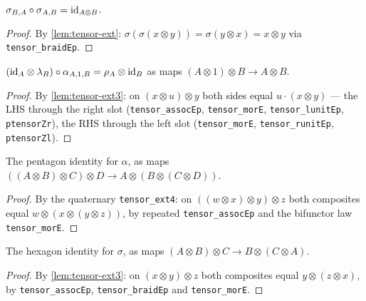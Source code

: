 \begin{lemma}\label{lem:braid-invol}
\rocqok
{}
$\sigma_{B,A} \circ \sigma_{A,B} = \mathrm{id}_{A \otimes B}$.
\end{lemma}
\begin{proof}
By \autoref{lem:tensor-ext}: $\sigma(\sigma(x \otimes y)) = \sigma(y
\otimes x) = x \otimes y$ via \texttt{tensor\_braidEp}.
\end{proof}

\begin{lemma}\label{lem:triangle}
\rocqok
{}
$(\mathrm{id}_A \otimes \lambda_B) \circ \alpha_{A,1,B} = \rho_A \otimes \mathrm{id}_B$
as maps $(A \otimes 1) \otimes B \to A \otimes B$.
\end{lemma}
\begin{proof}
By \autoref{lem:tensor-ext3}: on $(x \otimes u) \otimes y$ both sides
equal $u \cdot (x \otimes y)$ --- the LHS through the right slot
(\texttt{tensor\_assocEp}, \texttt{tensor\_morE},
\texttt{tensor\_lunitEp}, \texttt{ptensorZr}), the RHS through the left
slot (\texttt{tensor\_morE}, \texttt{tensor\_runitEp},
\texttt{ptensorZl}).
\end{proof}

\begin{lemma}\label{lem:pentagon}
\rocqok
{}
The pentagon identity for $\alpha$, as maps $((A \otimes B) \otimes C)
\otimes D \to A \otimes (B \otimes (C \otimes D))$.
\end{lemma}
\begin{proof}
By the quaternary \texttt{tensor\_ext4}: on $((w \otimes x) \otimes y)
\otimes z$ both composites equal $w \otimes (x \otimes (y \otimes z))$,
by repeated \texttt{tensor\_assocEp} and the bifunctor law
\texttt{tensor\_morE}.
\end{proof}

\begin{lemma}\label{lem:hexagon}
\rocqok
{}
The hexagon identity for $\sigma$, as maps $(A \otimes B) \otimes C \to
B \otimes (C \otimes A)$.
\end{lemma}
\begin{proof}
By \autoref{lem:tensor-ext3}: on $(x \otimes y) \otimes z$ both
composites equal $y \otimes (z \otimes x)$, by \texttt{tensor\_assocEp},
\texttt{tensor\_braidEp} and \texttt{tensor\_morE}.
\end{proof}

